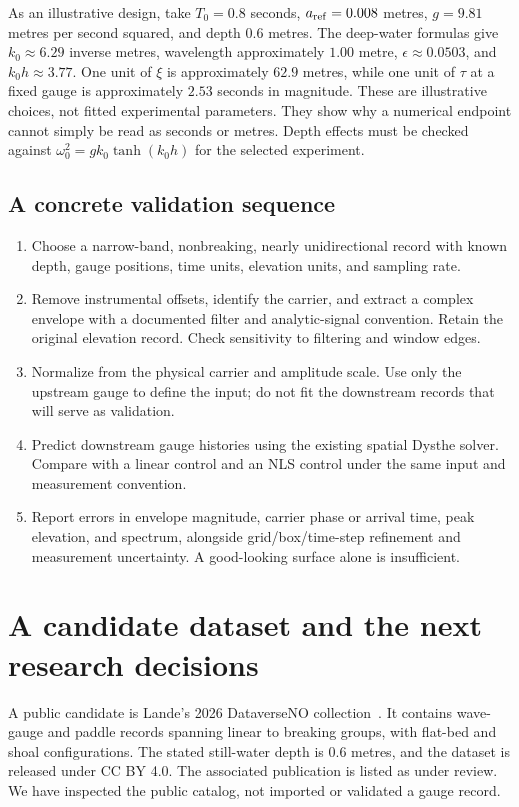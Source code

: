 \documentclass[10pt]{article}
\begin{document}
As an illustrative design, take $T_0=0.8$ seconds, $a_{\rm ref}=0.008$ metres, $g=9.81$ metres per second squared, and depth $0.6$ metres. The deep-water formulas give $k_0\approx6.29$ inverse metres, wavelength approximately $1.00$ metre, $\epsilon\approx0.0503$, and $k_0h\approx3.77$. One unit of $\xi$ is approximately $62.9$ metres, while one unit of $\tau$ at a fixed gauge is approximately $2.53$ seconds in magnitude. These are illustrative choices, not fitted experimental parameters. They show why a numerical endpoint cannot simply be read as seconds or metres. Depth effects must be checked against $\omega_0^2=gk_0\tanh(k_0h)$ for the selected experiment.

\subsection{A concrete validation sequence}
\begin{enumerate}
\item Choose a narrow-band, nonbreaking, nearly unidirectional record with known depth, gauge positions, time units, elevation units, and sampling rate.
\item Remove instrumental offsets, identify the carrier, and extract a complex envelope with a documented filter and analytic-signal convention. Retain the original elevation record. Check sensitivity to filtering and window edges.
\item Normalize from the physical carrier and amplitude scale. Use only the upstream gauge to define the input; do not fit the downstream records that will serve as validation.
\item Predict downstream gauge histories using the existing spatial Dysthe solver. Compare with a linear control and an NLS control under the same input and measurement convention.
\item Report errors in envelope magnitude, carrier phase or arrival time, peak elevation, and spectrum, alongside grid/box/time-step refinement and measurement uncertainty. A good-looking surface alone is insufficient.
\end{enumerate}

\newpage
\section{A candidate dataset and the next research decisions}
A public candidate is Lande's 2026 DataverseNO collection~\cite{Lande}. It contains wave-gauge and paddle records spanning linear to breaking groups, with flat-bed and shoal configurations. The stated still-water depth is $0.6$ metres, and the dataset is released under CC BY 4.0. The associated publication is listed as under review. We have inspected the public catalog, not imported or validated a gauge record.
\end{document}

